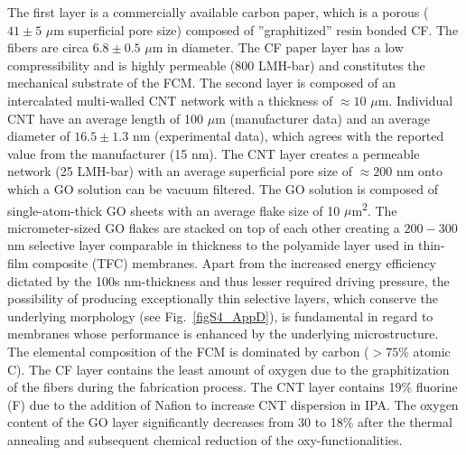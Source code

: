 The first layer is a commercially available carbon paper, which is a porous ($41\pm5$ $\mu$m superficial pore size) composed of ''graphitized'' resin bonded CF. The fibers are circa $6.8\pm0.5$ $\mu$m in diameter. The CF paper layer has a low compressibility and is highly permeable (800 LMH-bar) and constitutes the mechanical substrate of the FCM. The second layer is composed of an intercalated multi-walled CNT network with a thickness of $\approx10$ $\mu$m. Individual CNT have an average length of 100 $\mu$m (manufacturer data) and an average diameter of $16.5\pm1.3$ nm (experimental data), which agrees with the reported value from the manufacturer (15 nm). The CNT layer creates a permeable network (25 LMH-bar) with an average superficial pore size of $\approx200$ nm onto which a GO solution can be vacuum filtered. The GO solution is composed of single-atom-thick GO sheets with an average flake size of 10 $\mu$m\textsuperscript{2}. The micrometer-sized GO flakes are stacked on top of each other creating a $200-300$ nm selective layer comparable in thickness to the polyamide layer used in thin-film composite (TFC) membranes. Apart from the increased energy efficiency dictated by the 100s nm-thickness and thus lesser required driving pressure, the possibility of producing exceptionally thin selective layers, which conserve the underlying morphology (see Fig.~\ref{figS4_AppD}), is fundamental in regard to membranes whose performance is enhanced by the underlying microstructure.\cite{tang2016vacuum}
 The elemental composition of the FCM is dominated by carbon ($>75$\% atomic C). The CF layer contains the least amount of oxygen due to the graphitization of the fibers during the fabrication process. The CNT layer contains 19\% fluorine (F) due to the addition of Nafion to increase CNT dispersion in IPA. The oxygen content of the GO layer significantly decreases from 30 to 18\% after the thermal annealing and subsequent chemical reduction of the oxy-functionalities.


